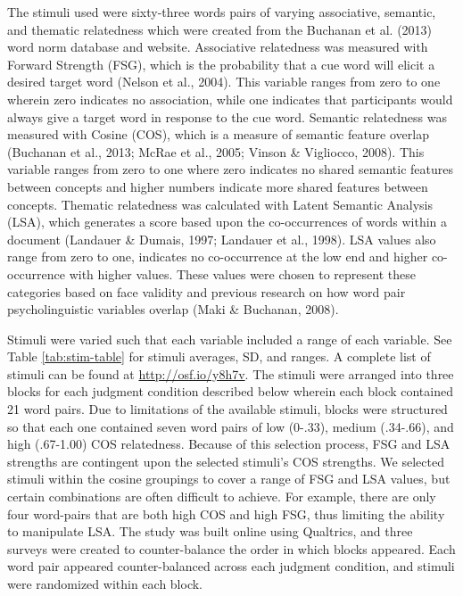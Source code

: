 \documentclass[english,man]{apa6}
\theoremstyle{definition}
\theoremstyle{definition}
\theoremstyle{definition}
\theoremstyle{remark}
\begin{document}
The stimuli used were sixty-three words pairs of varying associative,
semantic, and thematic relatedness which were created from the Buchanan
et al. (2013) word norm database and website. Associative relatedness
was measured with Forward Strength (FSG), which is the probability that
a cue word will elicit a desired target word (Nelson et al., 2004). This
variable ranges from zero to one wherein zero indicates no association,
while one indicates that participants would always give a target word in
response to the cue word. Semantic relatedness was measured with Cosine
(COS), which is a measure of semantic feature overlap (Buchanan et al.,
2013; McRae et al., 2005; Vinson \& Vigliocco, 2008). This variable
ranges from zero to one where zero indicates no shared semantic features
between concepts and higher numbers indicate more shared features
between concepts. Thematic relatedness was calculated with Latent
Semantic Analysis (LSA), which generates a score based upon the
co-occurrences of words within a document (Landauer \& Dumais, 1997;
Landauer et al., 1998). LSA values also range from zero to one,
indicates no co-occurrence at the low end and higher co-occurrence with
higher values. These values were chosen to represent these categories
based on face validity and previous research on how word pair
psycholinguistic variables overlap (Maki \& Buchanan, 2008).

Stimuli were varied such that each variable included a range of each
variable. See Table \ref{tab:stim-table} for stimuli averages, SD, and
ranges. A complete list of stimuli can be found at
\url{http://osf.io/y8h7v}. The stimuli were arranged into three blocks
for each judgment condition described below wherein each block contained
21 word pairs. Due to limitations of the available stimuli, blocks were
structured so that each one contained seven word pairs of low (0-.33),
medium (.34-.66), and high (.67-1.00) COS relatedness. Because of this
selection process, FSG and LSA strengths are contingent upon the
selected stimuli's COS strengths. We selected stimuli within the cosine
groupings to cover a range of FSG and LSA values, but certain
combinations are often difficult to achieve. For example, there are only
four word-pairs that are both high COS and high FSG, thus limiting the
ability to manipulate LSA. The study was built online using Qualtrics,
and three surveys were created to counter-balance the order in which
blocks appeared. Each word pair appeared counter-balanced across each
judgment condition, and stimuli were randomized within each block.
\end{document}
